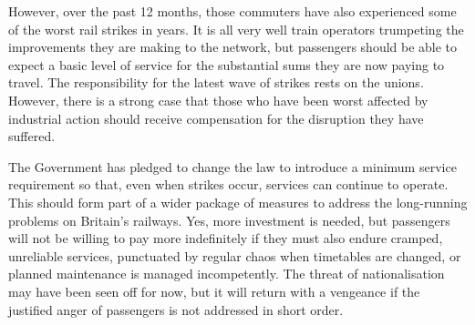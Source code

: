 However, over the past 12 months, those commuters have also experienced
some of the worst rail strikes in years. It is all very well train
operators trumpeting the improvements they are making to the network,
but passengers should be able to expect a basic level of service for the
substantial sums they are now paying to travel. The responsibility for
the latest wave of strikes rests on the unions. However, there is a
strong case that those who have been worst affected by industrial action
should receive compensation for the disruption they have suffered.

The Government has pledged to change the law to introduce a minimum
service requirement so that, even when strikes occur, services can
continue to operate. This should form part of a wider package of
measures to address the long-running problems on Britain's railways.
Yes, more investment is needed, but passengers will not be willing to
pay more indefinitely if they must also endure cramped, unreliable
services, punctuated by regular chaos when timetables are changed, or
planned maintenance is managed incompetently. The threat of
nationalisation may have been seen off for now, but it will return with
a vengeance if the justified anger of passengers is not addressed in
short order.

\vspace{1em}

